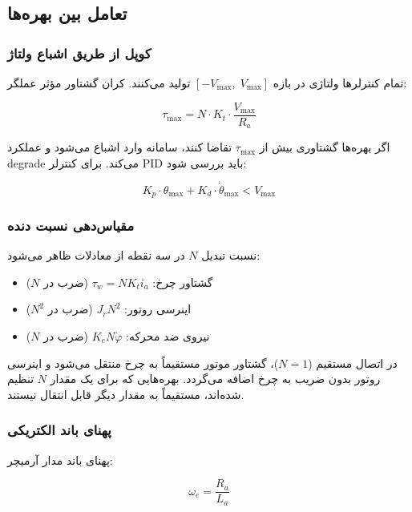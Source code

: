 \subsection{تعامل بین بهره‌ها}

\subsubsection{کوپل از طریق اشباع ولتاژ}

تمام کنترلرها ولتاژی در بازه $[-V_{\max},\; V_{\max}]$ تولید می‌کنند. کران گشتاور مؤثر عملگر:

\begin{equation}
\tau_{\max} = N \cdot K_t \cdot \frac{V_{\max}}{R_a}
\end{equation}

اگر بهره‌ها گشتاوری بیش از $\tau_{\max}$ تقاضا کنند، سامانه وارد اشباع می‌شود و عملکرد degrade می‌کند. برای کنترلر PID باید بررسی شود:

\begin{equation}
K_p \cdot \theta_{\max} + K_d \cdot \dot\theta_{\max} < V_{\max}
\end{equation}

\subsubsection{مقیاس‌دهی نسبت دنده}

نسبت تبدیل $N$ در سه نقطه از معادلات ظاهر می‌شود:
\begin{itemize}
    \item گشتاور چرخ: $\tau_w = N K_t i_a$ (ضرب در $N$)
    \item اینرسی روتور: $J_r N^2$ (ضرب در $N^2$)
    \item نیروی ضد محرکه: $K_e N \dot\varphi$ (ضرب در $N$)
\end{itemize}

در اتصال مستقیم ($N=1$)، گشتاور موتور مستقیماً به چرخ منتقل می‌شود و اینرسی روتور بدون ضریب به چرخ اضافه می‌گردد. بهره‌هایی که برای یک مقدار $N$ تنظیم شده‌اند، مستقیماً به مقدار دیگر قابل انتقال نیستند.

\subsubsection{پهنای باند الکتریکی}

پهنای باند مدار آرمیچر:

\begin{equation}
\omega_e = \frac{R_a}{L_a}
\end{equation}

